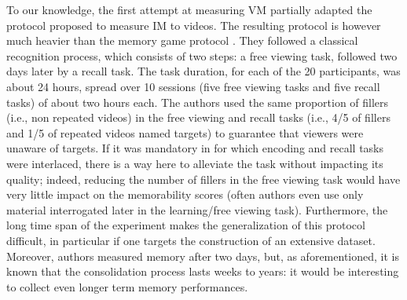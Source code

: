 \documentclass[sigconf]{acmart}
\begin{document}
To our knowledge, the first attempt at measuring VM \cite{han_2015_learning} partially adapted the protocol proposed to measure IM \cite{isola_2011_makes} to videos.
The resulting protocol is however much heavier than the memory game protocol \cite{isola_2011_makes}.
They followed a classical recognition process, which consists of two steps: a free viewing task, followed two days later by a recall task.
The task duration, for each of the 20 participants, was about 24 hours, spread over 10 sessions (five free viewing tasks and five recall tasks) of about two hours each.
The authors used the same proportion of fillers (i.e., non repeated videos) in the free viewing and recall tasks (i.e., 4/5 of fillers and 1/5 of repeated videos named targets) to guarantee that viewers were unaware of targets.
If it was mandatory in \cite{isola_2011_makes} for which encoding and recall tasks were interlaced, there is a way here to alleviate the task without impacting its quality; indeed, reducing the number of fillers in the free viewing task would have very little impact on the memorability scores (often authors even use only material interrogated later in the learning/free viewing task).
Furthermore, the long time span of the experiment makes the generalization of this protocol difficult, in particular if one targets the construction of an extensive dataset.
Moreover, authors measured memory after two days, but, as aforementioned, it is known that the consolidation process lasts weeks to years: it would be interesting to collect even longer term memory performances.
\end{document}
